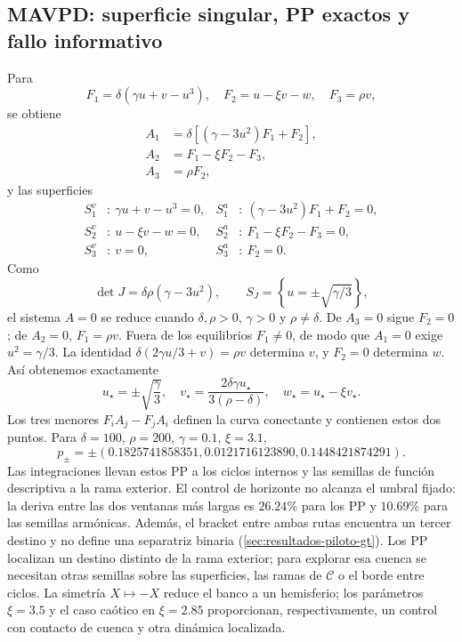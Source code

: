 \subsection{MAVPD: superficie singular, PP exactos y fallo informativo}
\label{subsec:casegt-mavpd}

Para
\begin{equation}
 F_1=\delta(\gamma u+v-u^3),\quad
 F_2=u-\xi v-w,\quad F_3=\rho v,
 \label{casegt:eq:mavpd-field}
\end{equation}
se obtiene
\begin{align}
 A_1&=\delta[(\gamma-3u^2)F_1+F_2],\nonumber\\
 A_2&=F_1-\xi F_2-F_3,\\
 A_3&=\rho F_2,
 \label{casegt:eq:mavpd-A}
\end{align}
y las superficies
\begin{align}
 S_1^v&:\ \gamma u+v-u^3=0,&
 S_1^a&:\ (\gamma-3u^2)F_1+F_2=0,\nonumber\\
 S_2^v&:\ u-\xi v-w=0,&
 S_2^a&:\ F_1-\xi F_2-F_3=0,\nonumber\\
 S_3^v&:\ v=0,& S_3^a&:\ F_2=0.
 \label{casegt:eq:mavpd-surfaces}
\end{align}
Como
\begin{equation}
 \det J=\delta\rho(\gamma-3u^2),
 \qquad
 S_J=\left\{u=\pm\sqrt{\gamma/3}\right\},
 \label{casegt:eq:mavpd-det}
\end{equation}
el sistema $A=0$ se reduce cuando
$\delta,\rho>0$, $\gamma>0$ y $\rho\ne\delta$.
De $A_3=0$ sigue $F_2=0$; de $A_2=0$, $F_1=\rho v$.
Fuera de los equilibrios $F_1\ne0$, de modo que $A_1=0$ exige
$u^2=\gamma/3$. La identidad
$\delta(2\gamma u/3+v)=\rho v$ determina $v$, y $F_2=0$ determina $w$.
Así obtenemos exactamente
\begin{equation}
 u_\star=\pm\sqrt{\frac\gamma3},
 \quad
 v_\star=\frac{2\delta\gamma u_\star}{3(\rho-\delta)},
 \quad
 w_\star=u_\star-\xi v_\star.
 \label{casegt:eq:mavpd-PP}
\end{equation}
Los tres menores $F_iA_j-F_jA_i$ definen la curva conectante y contienen estos
dos puntos. Para $\delta=100$, $\rho=200$, $\gamma=0.1$, $\xi=3.1$,
\begin{equation}
 p_\pm=\pm(0.1825741858351,0.0121716123890,0.1448421874291).
 \label{casegt:eq:mavpd-PP-numeric}
\end{equation}
Las integraciones llevan estos PP a los ciclos internos y las semillas de
función descriptiva a la rama exterior. El control de horizonte no alcanza
el umbral fijado: la deriva entre las dos ventanas más largas es
$26.24\%$ para los PP y $10.69\%$ para las semillas armónicas.
\ifHAFOBasinMaterial
Además, el bracket entre
ambas rutas encuentra un tercer destino y no define una separatriz binaria
(\cref{sec:resultados-piloto-gt}). Los PP localizan un destino distinto de la
rama exterior; para explorar esa cuenca se necesitan otras semillas sobre
las superficies, las ramas de $\mathcal C$ o el borde entre ciclos.
\fi
La simetría $X\mapsto-X$ reduce el banco a un hemisferio;
los parámetros $\xi=3.5$ y el caso caótico en $\xi=2.85$ proporcionan,
respectivamente, un control con contacto de cuenca y otra dinámica localizada.

